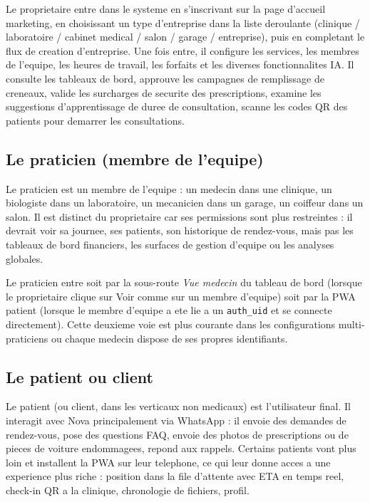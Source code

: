 Le proprietaire entre dans le systeme en s'inscrivant sur la page
d'accueil marketing, en choisissant un type d'entreprise dans la liste
deroulante (clinique / laboratoire / cabinet medical / salon / garage /
entreprise), puis en completant le flux de creation d'entreprise. Une
fois entre, il configure les services, les membres de l'equipe, les
heures de travail, les forfaits et les diverses fonctionnalites IA. Il
consulte les tableaux de bord, approuve les campagnes de remplissage de
creneaux, valide les surcharges de securite des prescriptions, examine
les suggestions d'apprentissage de duree de consultation, scanne les
codes QR des patients pour demarrer les consultations.

\subsection{Le praticien (membre de l'equipe)}
Le praticien est un membre de l'equipe : un medecin dans une clinique,
un biologiste dans un laboratoire, un mecanicien dans un garage, un
coiffeur dans un salon. Il est distinct du proprietaire car ses
permissions sont plus restreintes : il devrait voir sa journee, ses
patients, son historique de rendez-vous, mais pas les tableaux de bord
financiers, les surfaces de gestion d'equipe ou les analyses globales.

Le praticien entre soit par la sous-route \emph{Vue medecin} du tableau
de bord (lorsque le proprietaire clique sur \og Voir comme \fg{} sur un
membre d'equipe) soit par la PWA patient (lorsque le membre d'equipe a
ete lie a un \texttt{auth\_uid} et se connecte directement). Cette
deuxieme voie est plus courante dans les configurations multi-praticiens
ou chaque medecin dispose de ses propres identifiants.

\subsection{Le patient ou client}
Le patient (ou client, dans les verticaux non medicaux) est l'utilisateur
final. Il interagit avec Nova principalement via WhatsApp : il envoie des
demandes de rendez-vous, pose des questions FAQ, envoie des photos de
prescriptions ou de pieces de voiture endommagees, repond aux rappels.
Certains patients vont plus loin et installent la PWA sur leur telephone,
ce qui leur donne acces a une experience plus riche : position dans la
file d'attente avec ETA en temps reel, check-in QR a la clinique,
chronologie de fichiers, profil.

